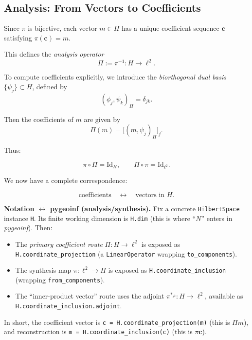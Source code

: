 \documentclass[11pt,twoside,openright]{book}
\theoremstyle{plain}
\theoremstyle{definition}
\theoremstyle{remark}
\begin{document}
\subsection{Analysis: From Vectors to Coefficients}

Since $\pi$ is bijective, each vector $m \in H$ has a unique
coefficient sequence $\mathbf{c}$ satisfying $\pi(\mathbf{c}) = m$.

This defines the \emph{analysis operator}
\[
\Pi := \pi^{-1} : H \to \ell^2.
\]

To compute coefficients explicitly, we introduce the
\emph{biorthogonal dual basis} $\{\psi_j\} \subset H$,
defined by
\begin{equation}
(\phi_j,\psi_k)_H = \delta_{jk}.
\end{equation}

Then the coefficients of $m$ are given by
\begin{equation}
\Pi(m) = \bigl[(m,\psi_j)_H\bigr]_j.
\end{equation}

Thus:

\[
\pi \circ \Pi = \mathrm{Id}_H,
\qquad
\Pi \circ \pi = \mathrm{Id}_{\ell^2}.
\]

We now have a complete correspondence:

\[
\text{coefficients} \quad \longleftrightarrow \quad \text{vectors in } H.
\]

\begin{codebox}
\textbf{Notation \texorpdfstring{$\leftrightarrow$}{<->} pygeoinf (analysis/synthesis).}
Fix a concrete \texttt{HilbertSpace} instance \texttt{H}. Its finite working dimension is
\texttt{H.dim} (this is where ``$N$'' enters in \textit{pygeoinf}). Then:
\begin{itemize}
  \item The \emph{primary coefficient route} $\Pi:H\to\ell^2$ is exposed as
  \texttt{H.coordinate\_projection} (a \texttt{LinearOperator} wrapping \texttt{to\_components}).
  \item The synthesis map $\pi:\ell^2\to H$ is exposed as
  \texttt{H.coordinate\_inclusion} (wrapping \texttt{from\_components}).
  \item The ``inner-product vector'' route uses the adjoint
  $\pi^{*_{\ell^2}}:H\to\ell^2$, available as \texttt{H.coordinate\_inclusion.adjoint}.
\end{itemize}
In short, the coefficient vector is \texttt{c = H.coordinate\_projection(m)} (this is $\Pi m$),
and reconstruction is \texttt{m = H.coordinate\_inclusion(c)} (this is $\pi\mathbf{c}$).
\end{codebox}
\end{document}

